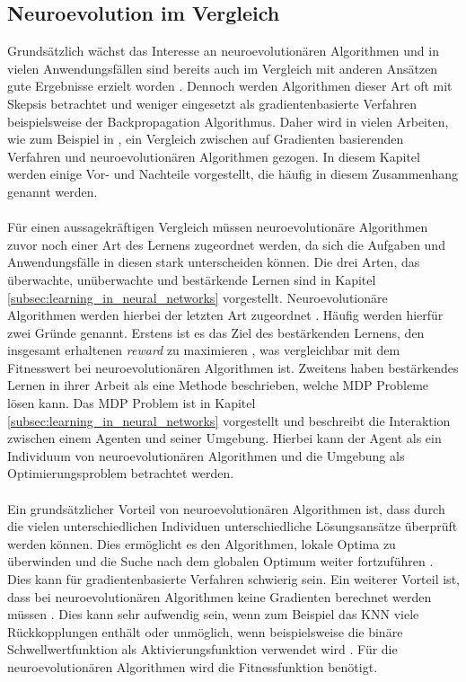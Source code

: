 \subsection{Neuroevolution im Vergleich}
\label{subsec:comparision_neuroevoltion}
Grundsätzlich wächst das Interesse an neuroevolutionären Algorithmen und in vielen Anwendungsfällen sind bereits auch im Vergleich mit anderen Ansätzen gute Ergebnisse erzielt worden \cite{meisner2009neurostrategies}. Dennoch werden Algorithmen dieser Art oft mit Skepsis betrachtet \cite{meisner2009neurostrategies} und weniger eingesetzt als gradientenbasierte Verfahren beispielsweise der Backpropagation Algorithmus. Daher wird in vielen Arbeiten, wie zum Beispiel in \cite{rojas1996neural, meisner2009neurostrategies, such2017deep, whitley1993genetic}, ein Vergleich zwischen auf Gradienten basierenden Verfahren und neuroevolutionären Algorithmen gezogen. In diesem Kapitel werden einige Vor- und Nachteile vorgestellt, die häufig in diesem Zusammenhang genannt werden.
\\\\
Für einen aussagekräftigen Vergleich müssen neuroevolutionäre Algorithmen zuvor noch einer Art des Lernens zugeordnet werden, da sich die Aufgaben und Anwendungsfälle in diesen stark unterscheiden können. Die drei Arten, das überwachte, unüberwachte und bestärkende Lernen sind in Kapitel \ref{subsec:learning_in_neural_networks} vorgestellt. Neuroevolutionäre Algorithmen werden hierbei der letzten Art zugeordnet \cite{whitley1993genetic}. Häufig werden hierfür zwei Gründe genannt. Erstens ist es das Ziel des bestärkenden Lernens, den insgesamt erhaltenen \emph{reward} zu maximieren \cite{such2017deep}, was vergleichbar mit dem Fitnesswert bei neuroevolutionären Algorithmen ist. Zweitens haben \citeauthor{sutton2018reinforcement} bestärkendes Lernen in ihrer Arbeit als eine Methode beschrieben, welche \ac{MDP} Probleme lösen kann. Das \ac{MDP} Problem ist in Kapitel \ref{subsec:learning_in_neural_networks} vorgestellt und beschreibt die Interaktion zwischen einem Agenten und seiner Umgebung. Hierbei kann der Agent als ein Individuum von neuroevolutionären Algorithmen und die Umgebung als Optimierungsproblem betrachtet werden. 
\\\\
Ein grundsätzlicher Vorteil von neuroevolutionären Algorithmen ist, dass durch die vielen unterschiedlichen Individuen unterschiedliche Lösungsansätze überprüft werden können. Dies ermöglicht es den Algorithmen, lokale Optima zu überwinden und die Suche nach dem globalen Optimum weiter fortzuführen \cite{rojas1996neural}. Dies kann für gradientenbasierte Verfahren schwierig sein. Ein weiterer Vorteil ist, dass bei neuroevolutionären Algorithmen keine Gradienten berechnet werden müssen \cite{rojas1996neural}. Dies kann sehr aufwendig sein, wenn zum Beispiel das \ac{KNN} viele Rückkopplungen enthält oder unmöglich, wenn beispielsweise die binäre Schwellwertfunktion als Aktivierungsfunktion verwendet wird \cite{whitley1993genetic}. Für die neuroevolutionären Algorithmen wird die Fitnessfunktion benötigt. 
